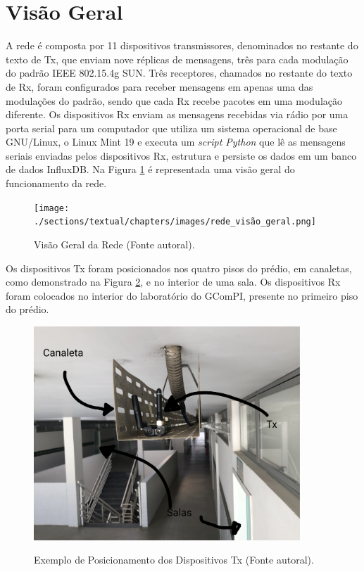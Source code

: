 \section{Visão Geral}
\label{subsec:visaogeral}
A rede é composta por 11 dispositivos transmissores, denominados no restante do texto de Tx, que enviam nove réplicas de mensagens, três para cada modulação do padrão IEEE 802.15.4g SUN. Três receptores, chamados no restante do texto de Rx, foram configurados para receber mensagens em apenas uma das modulações do padrão, sendo que cada Rx recebe pacotes em uma modulação diferente. Os dispositivos Rx enviam as mensagens recebidas via rádio por uma porta serial para um computador que utiliza um sistema operacional de base GNU/Linux, o Linux Mint 19 e executa um \emph{script Python} que lê as mensagens seriais enviadas pelos dispositivos Rx, estrutura e persiste os dados em um banco de dados InfluxDB. Na Figura \ref{fig:rede_visão_geral} é representada uma visão geral do funcionamento da rede.

\begin{figure}[H]
      \begin{center}
            \texttt{[image: ./sections/textual/chapters/images/rede\_visão\_geral.png]}\\
            \label{fig:rede_visão_geral}
            \caption{Visão Geral da Rede (Fonte autoral).}
      \end{center}
\end{figure}

Os dispositivos Tx foram posicionados nos quatro pisos do prédio, em canaletas, como demonstrado na Figura \ref{fig:tx_canaleta}, e no interior de uma sala. Os dispositivos Rx foram colocados no interior do laboratório do GComPI, presente no primeiro piso do prédio.

\begin{figure}[H]
      \begin{center}
            \includegraphics[width=10cm]{./sections/textual/chapters/images/tx_canaleta.jpg}\\
            \caption{Exemplo de Posicionamento dos Dispositivos Tx (Fonte autoral).}
            \label{fig:tx_canaleta}
      \end{center}
\end{figure}

